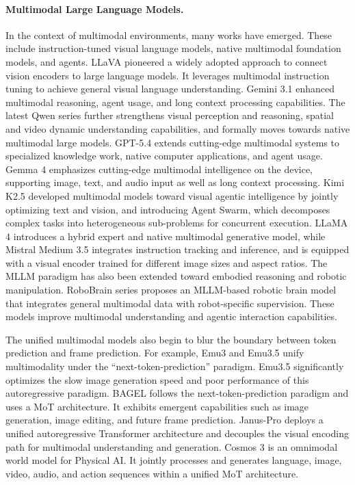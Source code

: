\paragraph{Multimodal Large Language Models.}\label{sec:mllms}
In the context of multimodal environments, many works have emerged. These include instruction-tuned visual language models, native multimodal foundation models, and agents.
LLaVA \citep{llava} pioneered a widely adopted approach to connect vision encoders to large language models. It leverages multimodal instruction tuning to achieve general visual language understanding. Gemini 3.1 \citep{Gemini-3.1-pro} enhanced multimodal reasoning, agent usage, and long context processing capabilities. The latest Qwen series \citep{Qwen3VL, qwen36_35b_a3b} further strengthens visual perception and reasoning, spatial and video dynamic understanding capabilities, and formally moves towards native multimodal large models. GPT-5.4 \citep{GPT54} extends cutting-edge multimodal systems to specialized knowledge work, native computer applications, and agent usage. Gemma 4 \citep{Gemma4} emphasizes cutting-edge multimodal intelligence on the device, supporting image, text, and audio input as well as long context processing. Kimi K2.5 \citep{KimiK2.5} developed multimodal models toward visual agentic intelligence by jointly optimizing text and vision, and introducing Agent Swarm, which decomposes complex tasks into heterogeneous sub-problems for concurrent execution. LLaMA 4 \citep{llama4} introduces a hybrid expert and native multimodal generative model, while Mistral Medium 3.5 \citep{Mistral-Medium-3.5} integrates instruction tracking and inference, and is equipped with a visual encoder trained for different image sizes and aspect ratios. The MLLM paradigm has also been extended toward embodied reasoning and robotic manipulation. RoboBrain series \citep{RoboBrain, RoboBrain2.0,reasonrft} proposes an MLLM-based robotic brain model that integrates general multimodal data with robot-specific supervision. These models improve multimodal understanding and agentic interaction capabilities.

The unified multimodal models also begin to blur the boundary between token prediction and frame prediction. For example, Emu3 \citep{Emu3} and Emu3.5 \citep{Emu35} unify multimodality under the ``next-token-prediction'' paradigm. Emu3.5 significantly optimizes the slow image generation speed and poor performance of this autoregressive paradigm. BAGEL \citep{BAGEL} follows the next-token-prediction paradigm and uses a MoT \citep{MoT} architecture. It exhibits emergent capabilities such as image generation, image editing, and future frame prediction. Janus-Pro \citep{Janus-Pro} deploys a unified autoregressive Transformer architecture and decouples the visual encoding path for multimodal understanding and generation. Cosmos 3 \citep{Cosmos3} is an omnimodal world model for Physical AI. It jointly processes and generates language, image, video, audio, and action sequences within a unified MoT architecture.


